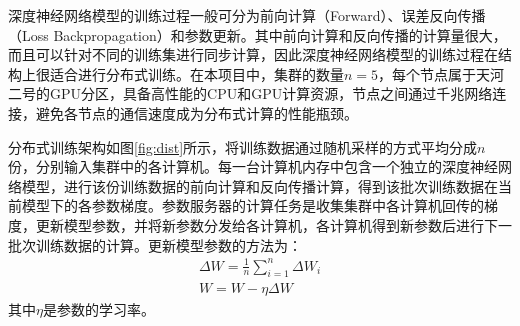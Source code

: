 深度神经网络模型的训练过程一般可分为前向计算（Forward）、误差反向传播（Loss Backpropagation）和参数更新。其中前向计算和反向传播的计算量很大，而且可以针对不同的训练集进行同步计算，因此深度神经网络模型的训练过程在结构上很适合进行分布式训练。在本项目中，集群的数量$n=5$，每个节点属于天河二号的GPU分区，具备高性能的CPU和GPU计算资源，节点之间通过千兆网络连接，避免各节点的通信速度成为分布式计算的性能瓶颈。

分布式训练架构如图\ref{fig:dist}所示，将训练数据通过随机采样的方式平均分成$n$份，分别输入集群中的各计算机。每一台计算机内存中包含一个独立的深度神经网络模型，进行该份训练数据的前向计算和反向传播计算，得到该批次训练数据在当前模型下的各参数梯度。参数服务器的计算任务是收集集群中各计算机回传的梯度，更新模型参数，并将新参数分发给各计算机，各计算机得到新参数后进行下一批次训练数据的计算。更新模型参数的方法为：
\begin{eqnarray}
\Delta W=\frac{1}{n}\sum_{i = 1}^{n}\Delta W_i \\
W=W-\eta\Delta W
\end{eqnarray}
其中$\eta$是参数的学习率。
